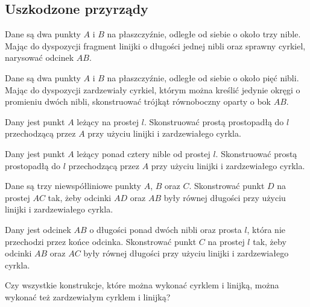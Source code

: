 \subsection{Uszkodzone przyrządy}
\begin{problem}
    Dane są dwa punkty $A$ i $B$ na płaszczyźnie, odległe od siebie o około trzy nible.
    Mając do dyspozycji fragment linijki o długości jednej nibli oraz sprawny cyrkiel, narysować odcinek $AB$.
\end{problem}

\begin{problem}
    Dane są dwa punkty $A$ i $B$ na płaszczyźnie, odległe od siebie o około pięć nibli.
    Mając do dyspozycji zardzewiały cyrkiel, którym można kreślić jedynie okręgi o promieniu dwóch nibli, skonstruować trójkąt równoboczny oparty o bok $AB$.
\end{problem}

\begin{problem}
    Dany jest punkt $A$ leżący na prostej $l$.
    Skonstruować prostą prostopadłą do $l$ przechodzącą przez $A$ przy użyciu linijki i zardzewiałego cyrkla.
\end{problem}

\begin{problem}
    Dany jest punkt $A$ leżący ponad cztery nible od prostej $l$.
    Skonstruować prostą prostopadłą do $l$ przechodzącą przez $A$ przy użyciu linijki i zardzewiałego cyrkla.
\end{problem}

\begin{problem}
    Dane są trzy niewspółliniowe punkty $A$, $B$ oraz $C$.
    Skonstrować punkt $D$ na prostej $AC$ tak, żeby odcinki $AD$ oraz $AB$ były równej długości przy użyciu linijki i zardzewiałego cyrkla.
\end{problem}

\begin{problem}
    Dany jest odcinek $AB$ o długości ponad dwóch nibli oraz prosta $l$, która nie przechodzi przez końce odcinka.
    Skonstrować punkt $C$ na prostej $l$ tak, żeby odcinki $AB$ oraz $AC$ były równej długości przy użyciu linijki i zardzewiałego cyrkla.
\end{problem}

\begin{problem}
    Czy wszystkie konstrukcje, które można wykonać cyrklem i linijką, można wykonać też zardzewiałym cyrklem i linijką?
\end{problem}

